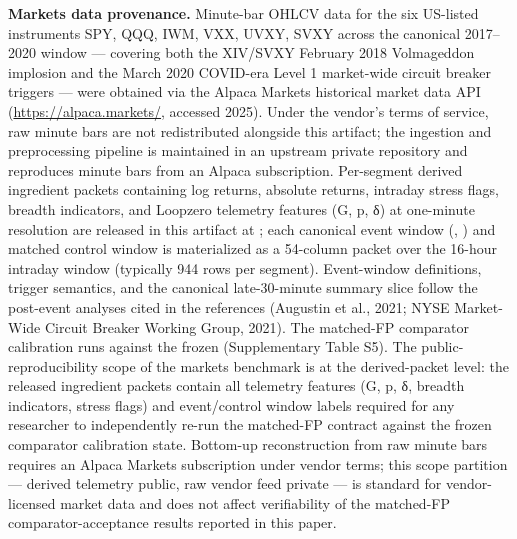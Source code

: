 \documentclass[
  11pt,
]{article}
\begin{document}
\textbf{Markets data provenance.} Minute-bar OHLCV data for the six
US-listed instruments SPY, QQQ, IWM, VXX, UVXY, SVXY across the
canonical 2017--2020 window --- covering both the XIV/SVXY February 2018
Volmageddon implosion and the March 2020 COVID-era Level 1 market-wide
circuit breaker triggers --- were obtained via the Alpaca Markets
historical market data API (\url{https://alpaca.markets/}, accessed
2025). Under the vendor's terms of service, raw minute bars are not
redistributed alongside this artifact; the ingestion and preprocessing
pipeline is maintained in an upstream private repository and reproduces
minute bars from an Alpaca subscription. Per-segment derived ingredient
packets containing log returns, absolute returns, intraday stress flags,
breadth indicators, and Loopzero telemetry features (G, p, δ) at
one-minute resolution are released in this artifact at
\texttt{};
each canonical event window (\texttt{},
\texttt{}) and matched control window is
materialized as a 54-column packet over the 16-hour intraday window
(typically 944 rows per segment). Event-window definitions, trigger
semantics, and the canonical late-30-minute summary slice follow the
post-event analyses cited in the references (Augustin et al., 2021; NYSE
Market-Wide Circuit Breaker Working Group, 2021). The matched-FP
comparator calibration runs against the frozen
\texttt{} (Supplementary Table
S5). The public-reproducibility scope of the markets benchmark is at the
derived-packet level: the released ingredient packets contain all
telemetry features (G, p, δ, breadth indicators, stress flags) and
event/control window labels required for any researcher to independently
re-run the matched-FP contract against the frozen comparator calibration
state. Bottom-up reconstruction from raw minute bars requires an Alpaca
Markets subscription under vendor terms; this scope partition ---
derived telemetry public, raw vendor feed private --- is standard for
vendor-licensed market data and does not affect verifiability of the
matched-FP comparator-acceptance results reported in this paper.
\end{document}
